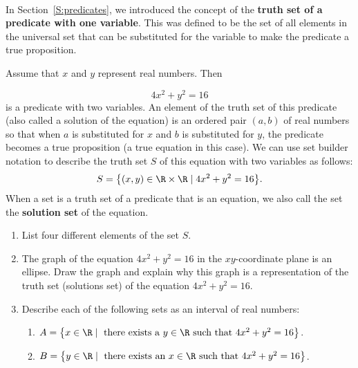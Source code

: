 \begin{previewactivity} \label{PA:eqn2variables} \hfill \\
In Section~\ref{S:predicates}, we introduced the concept of the \textbf{truth set of a predicate with one variable}.
%
  This was defined to be the set of all elements in the universal set that can be substituted for the variable to make the predicate a true proposition.

Assume that  $x$  and  $y$  represent real numbers.  Then 

\[
4x^2  + y^2  = 16
\]
is a predicate with two variables.  An element of the truth set of this predicate (also called a solution of the equation) is an ordered pair  $\left( {a, b} \right)$ of real numbers so that when  $a$  is substituted for  $x$  and  $b$  is substituted for  $y$, the predicate becomes a true proposition (a true equation in this case).  We can use set builder notation to describe the truth set $S$ of this equation with two variables as follows:
\[
S = \left\{ (x, y) \in \R \times \R \mid 4x^2 + y^2 = 16 \right\}\!.
\]
When a set is a truth set of a predicate that is an equation, we also call the set the 
\textbf{solution set} of the equation.
\begin{enumerate}
\item List four different elements of the set $S$\!.

\item The graph of the equation  $4x^2  + y^2  = 16$  in the $xy$-coordinate plane is an ellipse.  Draw the graph and explain why this graph is a representation of the truth set (solutions set) of the equation $4x^2 + y^2 = 16$.


\item Describe each of the following sets as an interval of real numbers:
\label{PA:eqn2variables3}
\begin{enumerate}
\item $A = \left\{ x \in \R \mid \text{ there exists a } y \in \R \text{ such that } 4x^2 + y^2 = 16 \right\}$.

\item $B = \left\{ y \in \R \mid \text{ there exists an } x \in \R \text{ such that } 4x^2 + y^2 = 16 \right\}$.
\end{enumerate}

\end{enumerate}
\end{previewactivity}
\hbreak
%

